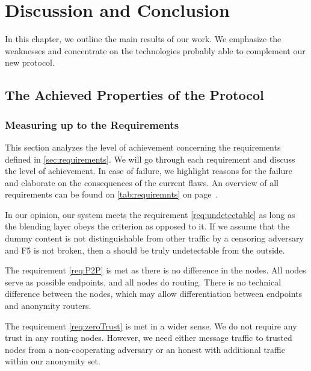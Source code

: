 \part{Discussion and Conclusion}

In this chapter, we outline the main results of our work. We emphasize the weaknesses and concentrate on the technologies probably able to complement our new protocol.

\chapter{The Achieved Properties of the Protocol}
\section{Measuring up to the Requirements\label{sec:reqDiscussion}}
This section analyzes the level of achievement concerning the requirements defined in \cref{sec:requirements}. We will go through each requirement and discuss the level of achievement. In case of failure, we highlight reasons for the failure and elaborate on the consequences of the current flaws. An overview of all requirements can be found on \cref{tab:requiremnts} on page~\pageref{tab:requiremnts}.

In our opinion, our system meets the requirement \ref{req:undetectable} as long as the blending layer obeys the criterion as opposed to it. If we assume that the dummy content is not distinguishable from other traffic by a censoring adversary and F5 is not broken, then a \VortexNode{} should be truly undetectable from the outside.

The requirement \ref{req:P2P} is met as there is no difference in the nodes. All nodes serve as possible endpoints, and all nodes do routing. There is no technical difference between the nodes, which may allow differentiation between endpoints and anonymity routers.

The requirement \ref{req:zeroTrust} is met in a wider sense. We do not require any trust in any routing nodes. However, we need either message traffic to trusted nodes from a non-cooperating adversary or an honest \VortexNodes{} with additional traffic within our anonymity set. 

